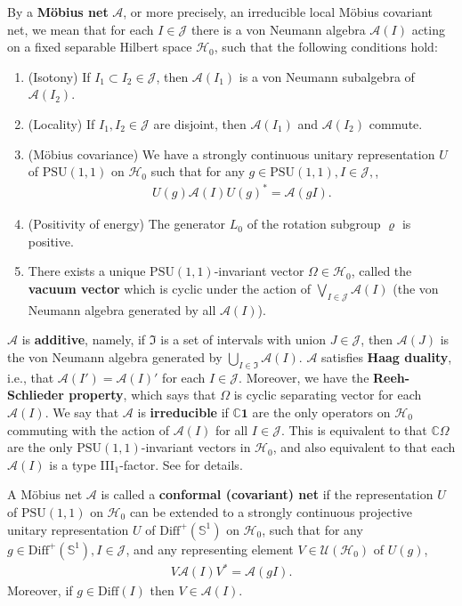 \documentclass[12pt,a4paper,notitlepage]{article}
\theoremstyle{definition}
\theoremstyle{plain}
\newcommand{\fk}{\mathfrak}
\newcommand{\mc}{\mathcal}
\newcommand{\id}{\mathbf{1}}
\newcommand{\Diffp}{\mathrm{Diff}^+}
\newcommand{\Diff}{\mathrm{Diff}}
\newcommand{\PSU}{\mathrm{PSU}(1,1)}
\newcommand{\mbb}{\mathbb}
\newcommand{\Cbb}{\mathbb C}
\numberwithin{equation}{section}
\begin{document}
By a  \textbf{M\"obius net} $\mc A$, or more precisely, an irreducible local M\"obius covariant net, we mean that for each $I\in\mathcal J$ there is a von Neumann algebra $\mathcal A(I)$ acting on a fixed separable Hilbert space $\mathcal H_0$, such that the following conditions hold:
\begin{enumerate}[label=(\alph*)]
\item (Isotony) If $I_1\subset I_2\in\mathcal J$, then $\mathcal A(I_1)$ is a von Neumann subalgebra of $\mathcal A(I_2)$.
\item (Locality) If $I_1,I_2\in\mathcal J$ are disjoint, then $\mathcal A(I_1)$ and $\mathcal A(I_2)$ commute.
\item (M\"obius covariance) We have a strongly continuous  unitary representation $U$ of $\PSU$ on $\mc H_0$ such that for any $g\in\PSU, I\in\mc J,$, 
\begin{align*}
	U(g)\mc A(I)U(g)^*=\mc A(gI).
\end{align*}
\item (Positivity of energy) The generator $L_0$ of the rotation subgroup $\varrho$  is positive.
\item There exists a unique $\PSU$-invariant vector $\Omega\in\mc H_0$, called the \textbf{vacuum vector} which is  cyclic under the action of $\bigvee_{I\in\mathcal J}\mathcal A(I)$ (the von Neumann algebra generated by all $\mathcal A(I)$).
\end{enumerate}

$\mc A$ is \textbf{additive}, namely, if $\fk I$ is a set of intervals with union $J\in\mc J$, then $\mc A(J)$ is the von Neumann algebra generated by $\bigcup_{I\in\fk I}\mc A(I)$. $\mc A$ satisfies \textbf{Haag duality}, i.e., that $\mc A(I')=\mc A(I)'$ for each $I\in \mc J$. Moreover, we have the \textbf{Reeh-Schlieder property}, which says that $\Omega$ is  cyclic separating vector for each $\mc A(I)$. We say that $\mc A$ is \textbf{irreducible} if $\Cbb \id$ are the only operators on $\mc H_0$ commuting with the action of $\mc A(I)$ for all $I\in\mc J$. This is equivalent to that $\Cbb\Omega$ are the only $\PSU$-invariant vectors in $\mc H_0$, and also equivalent to that each $\mc A(I)$ is a type III$_1$-factor.  See \cite[Sec. 1]{GL96} for details.



A M\"obius net $\mc A$ is called a \textbf{conformal (covariant) net} if the representation $U$ of $\PSU$ on $\mc H_0$ can be extended to a strongly continuous projective unitary representation $U$ of $\Diffp(\mbb S^1)$ on $\mathcal H_0$, such that for any $g\in \Diffp(\mbb S^1),I\in\mathcal J$, and any representing element $V\in\mathcal U(\mathcal H_0)$ of $U(g)$,
\begin{align*}
	V\mathcal A(I)V^*=\mathcal A(gI).
\end{align*}
Moreover, if $g\in\Diff(I)$ then $V\in\mc A(I)$.
\end{document}
